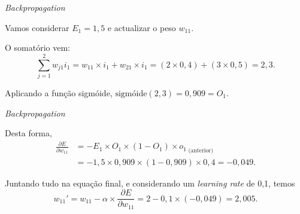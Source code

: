 \begin{frame}{\textit{Backpropagation} \cont}

    \begin{example}
    
    \begin{figure}
        \centering
        
    \end{figure}

    Vamos considerar $E_1 = 1,5$ e actualizar o peso $w_{11}$.
    
    \pauseskip
    
    O somatório vem:
    \begin{equation}
        \sum_{j=1}^2 w_{j1} i_1 = w_{11} \times i_1 + w_{21} \times i_1 = (2 \times 0,4) + (3 \times 0,5) = 2,3. 
    \end{equation}
    
    \pauseskip
    
    Aplicando a função sigmóide, $\text{sigmóide}(2,3) = 0,909 = O_1$.
    
    \end{example}

\end{frame}

\begin{frame}{\textit{Backpropagation} \cont}

    \begin{example}
    
    \begin{figure}
        \centering
        
    \end{figure}

    Desta forma,
    \begin{equation}
        \begin{split}
             \frac{\partial E}{\partial w_{11}} &= -E_1 \times O_1 \times (1-O_1) \times {o_1}_{\; \text{(anterior)}} \\
            &= -1,5 \times 0,909 \times (1 - 0,909)\times0,4 = -0,049.
        \end{split}
    \end{equation}
    
    \pauseskip
    
    Juntando tudo na equação final, e considerando um \textit{learning rate} de 0,1, temos
    \begin{equation}
        w_{11}' = w_{11} - \alpha \times \frac{\partial E}{\partial w_{11}} =  2 - 0,1 \times (-0,049) = 2,005.
    \end{equation}
        
    \end{example}

\end{frame}

